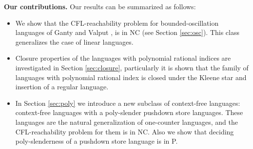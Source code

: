 \documentclass{ws-ijfcs}
\begin{document}
\textbf{Our contributions.} Our results can be summarized as follows:
\begin{itemize}
\item We show that the CFL-reachability problem for bounded-oscillation languages of Ganty and Valput \cite{BoundOsc}, is in NC (see Section \ref{sec:osc}). This class generalizes the case of linear languages. 
\item Closure properties of the languages with polynomial rational indices are investigated in Section \ref{sec:closure}, particularly it is shown that the family of languages with polynomial rational index is closed under the Kleene star and insertion of a regular language.
\item In Section \ref{sec:poly} we introduce a new subclass of context-free languages: context-free languages with a poly-slender pushdown store languages. These languages are the natural generalization of one-counter languages, and the CFL-reachability problem for them is in NC. Also we show that deciding poly-slenderness of a pushdown store language is in P.
\end{itemize}






\end{document}
